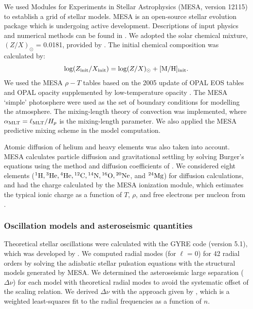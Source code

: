 \documentclass[a4paper,fleqn,usenatbib]{mnras}
\newcommand{\dnu}{\ensuremath{\Delta\nu}}
\begin{document}
We used Modules for Experiments in Stellar Astrophysics
(\textsc{MESA}, version 12115) to establish a grid of stellar models. 
\textsc{MESA} is an open-source stellar evolution package which is undergoing active development. 
Descriptions of input physics and numerical methods
can be found in \citet{Paxton.Bildsten.ea2011, Paxton.Cantiello.ea2013, Paxton.Marchant.ea2015, Paxton.Schwab.ea2018, Paxton.Smolec.ea2019}.
We adopted the solar chemical mixture, $(Z/X)_{\odot}$ = 0.0181,
 provided by \citet{Asplund.Grevesse.ea2009}. 
The initial chemical composition was calculated by:
%
\begin{equation}
\log (Z_{\rm{init}}/X_{\rm{init}}) = \log (Z/X)_{\odot} + \rm{[M/H]_{init}}.  \\
\end{equation}
%
We used the \textsc{MESA} $\rho-T$ tables based on the 2005
update of OPAL EOS tables \citep{Rogers.Nayfonov2002} and OPAL opacity
supplemented by low-temperature opacity \citep{Ferguson.Alexander.ea2005}. The \textsc{MESA} ‘simple’ photosphere were used as the set of boundary conditions for modelling the atmosphere.
The mixing-length theory of convection was implemented, where 
$\alpha_{\rm MLT} = \ell_{\rm MLT}/H_p$ is the mixing-length parameter. 
We also applied the \textsc{MESA} predictive mixing scheme \citep{Paxton.Schwab.ea2018, Paxton.Smolec.ea2019} in the model computation. 

Atomic diffusion of helium and heavy elements was also taken into account. \textsc{MESA} calculates particle diffusion and gravitational settling by solving Burger's equations using the method
and diffusion coefficients of \citet{Thoul.Bahcall.ea1994}. We considered eight elements (${}^1{\rm H}, {}^3{\rm He}, {}^4{\rm He}, {}^{12}{\rm C}, {}^{14}{\rm N}, {}^{16}{\rm O}, {}^{20}{\rm Ne}$, and ${}^{24}{\rm Mg}$)
for diffusion calculations, and had the charge calculated by the \textsc{MESA} ionization module, which estimates the typical ionic charge as a function of $T$, $\rho$, and free electrons per nucleon from \citet{Paquette.Pelletier.ea1986}.

\subsubsection{Oscillation models and asteroseismic quantities}\label{subsec:seismo_model}

Theoretical stellar oscillations were calculated with the \textsc{GYRE} code (version 5.1), which was developed by \citet{Townsend.Teitler2013}. We computed radial modes (for $\ell$ = 0) for 42 radial orders by solving the adiabatic stellar pulsation equations with the structural models generated by \textsc{MESA}. We determined the asteroseismic large separation ($\dnu$) for each model with theoretical radial modes to avoid the systematic offset of the scaling relation. We derived $\Delta \nu$ with the approach given by \citet{White.Bedding.ea2011}, which is a weighted least-squares fit to the radial frequencies as a function of $n$.
\end{document}
